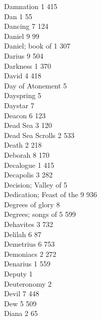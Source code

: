 Damnation \hfill 1 \quad \phantom{0}415\\
Dan \hfill 1 \quad \phantom{0}\phantom{0}55\\
Dancing \hfill 7 \quad \phantom{0}124\\
Daniel \hfill 9 \quad \phantom{0}\phantom{0}99\\
Daniel; book of \hfill 1 \quad \phantom{0}307\\
Darius \hfill 9 \quad \phantom{0}504\\
Darkness \hfill 1 \quad \phantom{0}370\\
David \hfill 4 \quad \phantom{0}418\\
Day of Atonement \hfill 5 \\
Dayspring \hfill 5 \\
Daystar \hfill 7 \\
Deacon \hfill 6 \quad \phantom{0}123\\
Dead Sea \hfill 3 \quad \phantom{0}120\\
Dead Sea Scrolls \hfill 2 \quad \phantom{0}533\\
Death \hfill 2 \quad \phantom{0}218\\
Deborah \hfill 8 \quad \phantom{0}170\\
Decalogue \hfill 1 \quad \phantom{0}415\\
Decapolis \hfill 3 \quad \phantom{0}282\\
Decision; Valley of \hfill 5 \\
Dedication; Feast of the \hfill 9 \quad \phantom{0}936\\
Degrees of glory \hfill 8 \\
Degrees; songs of \hfill 5 \quad \phantom{0}599\\
Dehavites \hfill 3 \quad \phantom{0}732\\
Delilah \hfill 6 \quad \phantom{0}\phantom{0}87\\
Demetrius \hfill 6 \quad \phantom{0}753\\
Demoniacs \hfill 2 \quad \phantom{0}272\\
Denarius \hfill 1 \quad \phantom{0}559\\
Deputy \hfill 1 \\
Deuteronomy \hfill 2 \\
Devil \hfill 7 \quad \phantom{0}448\\
Dew \hfill 5 \quad \phantom{0}509\\
Diana \hfill 2 \quad \phantom{0}\phantom{0}65\\
